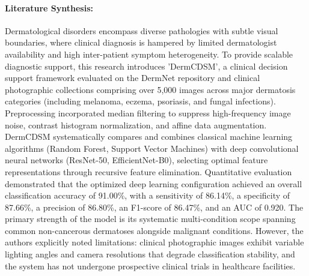 \paragraph{Literature Synthesis:} Dermatological disorders encompass diverse pathologies with subtle visual boundaries, where clinical diagnosis is hampered by limited dermatologist availability and high inter-patient symptom heterogeneity. To provide scalable diagnostic support, this research introduces 'DermCDSM', a clinical decision support framework evaluated on the DermNet repository and clinical photographic collections comprising over 5,000 images across major dermatosis categories (including melanoma, eczema, psoriasis, and fungal infections). Preprocessing incorporated median filtering to suppress high-frequency image noise, contrast histogram normalization, and affine data augmentation. DermCDSM systematically compares and combines classical machine learning algorithms (Random Forest, Support Vector Machines) with deep convolutional neural networks (ResNet-50, EfficientNet-B0), selecting optimal feature representations through recursive feature elimination. Quantitative evaluation demonstrated that the optimized deep learning configuration achieved an overall classification accuracy of 91.00\%, with a sensitivity of 86.14\%, a specificity of 87.66\%, a precision of 86.80\%, an F1-score of 86.47\%, and an AUC of 0.920. The primary strength of the model is its systematic multi-condition scope spanning common non-cancerous dermatoses alongside malignant conditions. However, the authors explicitly noted limitations: clinical photographic images exhibit variable lighting angles and camera resolutions that degrade classification stability, and the system has not undergone prospective clinical trials in healthcare facilities.

